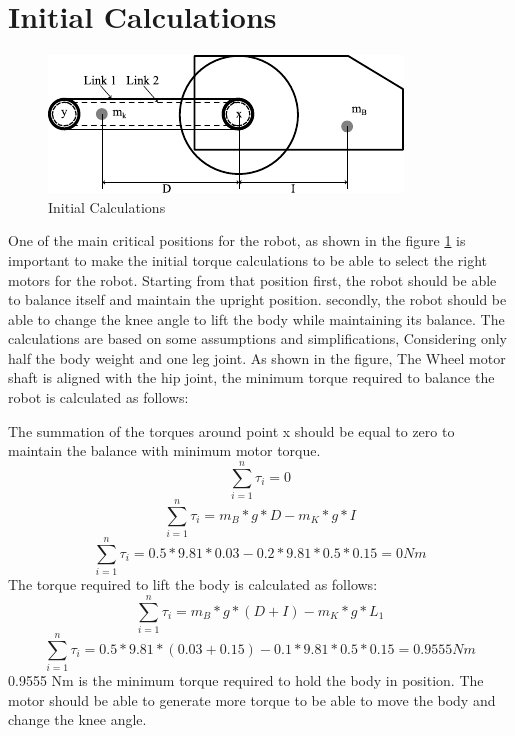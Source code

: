 \section{Initial Calculations}
\begin{figure}[h]
	\centering
	\includegraphics[width=0.7\linewidth]{Initial Calculations}
	\caption[Initial Calculations]{Initial Calculations}
	\label{fig:initialcalculations}
\end{figure}
One of the main critical positions for the robot, as shown in the figure \ref{fig:initialcalculations} is important to make the initial torque calculations to be able to select the right motors for the robot.
Starting from that position first, the robot should be able to balance itself and maintain the upright position.
secondly, the robot should be able to change the knee angle to lift the body while maintaining its balance.
The calculations are based on some assumptions and simplifications, Considering only half the body weight and one leg joint.
As shown in the figure, The Wheel motor shaft is aligned with the hip joint, the minimum torque required to balance the robot is calculated as follows:

The summation of the torques around point x should be equal to zero to maintain the balance with minimum motor torque.
\begin{equation}
	\sum_{i=1}^{n} \tau_{i}=0
\end{equation}
\begin{equation}
	\sum_{i=1}^{n} \tau_{i}=m_{B}*g*D-m_{K}*g*I
\end{equation}
\begin{equation}
	\sum_{i=1}^{n} \tau_{i}=0.5*9.81*0.03-0.2*9.81*0.5*0.15=0 Nm
\end{equation}
The torque required to lift the body is calculated as follows:
\begin{equation}
	\sum_{i=1}^{n} \tau_{i}=m_{B}*g*(D+I)-m_{K}*g*L_{1}
\end{equation}
\begin{equation}
	\sum_{i=1}^{n} \tau_{i}=0.5*9.81*(0.03+0.15)-0.1*9.81*0.5*0.15=0.9555 Nm
\end{equation}
0.9555 Nm is the minimum torque required to hold the body in position. The motor should be able to generate more torque to be able to move the body and change the knee angle.

